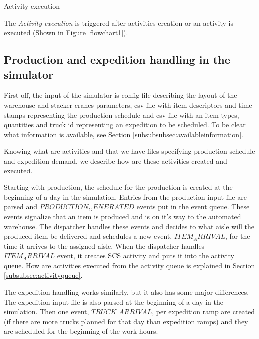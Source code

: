 \documentclass{ctuthesis}
\begin{document}
\begin{algorithm}[H]
\SetAlgoLined
{
}
\caption{Activity execution}
\label{alg:activityexec}
\end{algorithm}

The \emph{Activity execution} is triggered after activities creation or an activity is executed (Shown in Figure \ref{flowchart1}).


\subsection{Production and expedition handling in the simulator}

First off, the input of the simulator is config file describing the layout of the warehouse and stacker cranes parameters, csv file with item descriptors and time stamps representing the production schedule and csv file with an item types, quantities and truck id representing an expedition to be scheduled. To be clear what information is available, see Section \ref{subsubsubsec:availableinformation}.

Knowing what are activities and that we have files specifying production schedule and expedition demand, we describe how are these activities created and executed.

Starting with production, the schedule for the production is created at the beginning of a day in the simulation. Entries from the production input file are parsed and $PRODUCTION_GENERATED$ events put in the event queue. These events signalize that an item is produced and is on it's way to the automated warehouse. The dispatcher handles these events and decides to what aisle will the produced item be delivered and schedules a new event, $ITEM_ARRIVAL$, for the time it arrives to the assigned aisle. When the dispatcher handles $ITEM_ARRIVAL$ event, it creates SCS activity and puts it into the activity queue. How are activities executed from the activity queue is explained in Section \ref{subsubsec:activityqueue}.

The expedition handling works similarly, but it also has some major differences. The expedition input file is also parsed at the beginning of a day in the simulation. Then one event, $TRUCK\_ARRIVAL$, per expedition ramp are created (if there are more trucks planned for that day than expedition ramps) and they are scheduled for the beginning of the work hours. 
\end{document}
